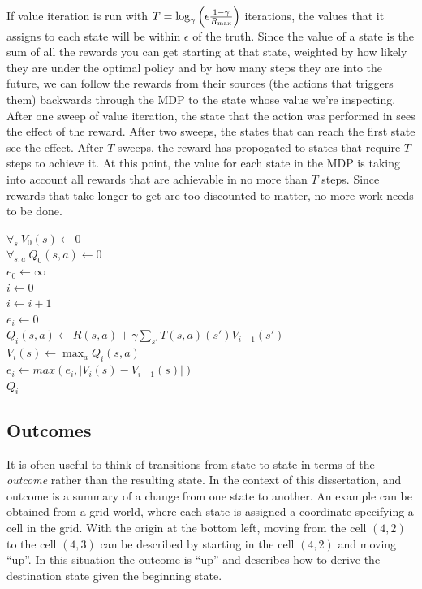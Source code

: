 If value iteration is run with $T=\log_\gamma\left(\epsilon \frac {1-\gamma} {R_{\rm max}}\right)$ iterations, the values that it assigns to each state will be within $\epsilon$ of the truth. Since the value of a state is the sum of all the rewards you can get starting at that state, weighted by how likely they are under the optimal policy and by how many steps they are into the future, we can follow the rewards from their sources (the actions that triggers them) backwards through the MDP to the state whose value we're inspecting. After one sweep of value iteration, the state that the action was performed in sees the effect of the reward. After two sweeps, the states that can reach the first state see the effect. After $T$ sweeps, the reward has propogated to states that require $T$ steps to achieve it. At this point, the value for each state in the MDP is taking into account all rewards that are achievable in no more than $T$ steps. Since rewards that take longer to get are too discounted to matter, no more work needs to be done.

\begin{algorithm}[tb]
	\caption{$\mbox{Value iteration}(S, A, R, T, \gamma, \epsilon)$}
	\label{alg:vi}
	$\forall_s\ V_0(s)\leftarrow 0$\\
	$\forall_{s,a}\ Q_0(s,a)\leftarrow 0$\\
	$e_0 \leftarrow \infty$\\
	$i \leftarrow 0$\\
	 {
		$i \leftarrow i+1$\\
		$e_i \leftarrow 0$\\
		 {
			 {
				$Q_i(s,a) \leftarrow R(s,a) + \gamma \sum_{s'} T(s,a)(s') V_{i-1}(s')$
			}
			$V_i(s) \leftarrow \max_a Q_i(s,a)$\\
			$e_i \leftarrow max(e_i, |V_i(s)-V_{i-1}(s)|)$\\
		}
	}
	\Return $Q_i$
\end{algorithm}

\subsection{Outcomes}

It is often useful to think of transitions from state to state in terms of the \emph{outcome} rather than the resulting state. In the context of this dissertation, and outcome is a summary of a change from one state to another. An example can be obtained from a grid-world, where each state is assigned a coordinate specifying a cell in the grid. With the origin at the bottom left, moving from the cell $(4,2)$ to the cell $(4,3)$ can be described by starting in the cell $(4,2)$ and moving ``up''. In this situation the outcome is ``up'' and describes how to derive the destination state given the beginning state.

